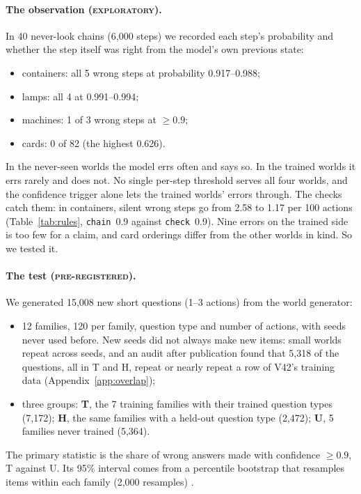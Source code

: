 \documentclass[11pt]{article}
\newcommand{\prereg}{\textsc{pre-registered}}
\newcommand{\explo}{\textsc{exploratory}}
\begin{document}
\paragraph{The observation (\explo).} In 40 never-look chains (6,000 steps) we recorded each step's probability and
whether the step itself was right from the model's own previous state:
\begin{itemize}
  \item containers: all 5 wrong steps at probability 0.917--0.988;
  \item lamps: all 4 at 0.991--0.994;
  \item machines: 1 of 3 wrong steps at $\ge 0.9$;
  \item cards: 0 of 82 (the highest 0.626).
\end{itemize}
In the never-seen worlds the model errs often and says so. In the trained worlds it errs rarely and does not. No single
per-step threshold serves all four worlds, and the confidence trigger alone lets the trained worlds' errors through.
The checks catch them: in containers, silent wrong steps go from 2.58 to 1.17 per 100 actions (Table~\ref{tab:rules},
\texttt{chain}~0.9 against \texttt{check}~0.9). Nine errors on the trained side is too few for a claim, and card
orderings differ from the other worlds in kind. So we tested it.

\paragraph{The test (\prereg).} We generated 15,008 new short questions (1--3 actions) from the world generator:
\begin{itemize}
  \item 12 families, 120 per family, question type and number of actions, with seeds never used before. New seeds
  did not always make new items: small worlds repeat across seeds, and an audit after publication found that 5,318 of
  the questions, all in T and H, repeat or nearly repeat a row of V42's training data (Appendix~\ref{app:overlap});
  \item three groups: \textbf{T}, the 7 training families with their trained question types (7,172); \textbf{H}, the
  same families with a held-out question type (2,472); \textbf{U}, 5 families never trained (5,364).
\end{itemize}
The primary statistic is the share of wrong answers made with confidence $\ge 0.9$, T against U. Its 95\% interval
comes from a percentile bootstrap that resamples items within each family (2,000 resamples) \cite{efron1979}.
\end{document}
